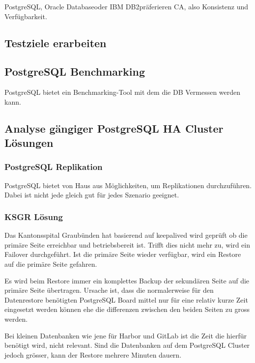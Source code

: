 \Gls{PostgreSQL}, \Gls{Oracle Database}oder \Gls{IBM DB2}präferieren CA, also Konsistenz und Verfügbarkeit.

\subsection{Testziele erarbeiten}
\subsection{PostgreSQL Benchmarking}
PostgreSQL bietet ein Benchmarking-Tool\cite{TYJFF7AB,VXNYQFTE} mit dem die DB Vermessen werden kann.
\subsection{Analyse gängiger PostgreSQL HA Cluster Lösungen}
\subsubsection{\Gls{PostgreSQL} Replikation}
PostgreSQL bietet von Haus aus Möglichkeiten, um Replikationen durchzuführen.
Dabei ist nicht jede gleich gut für jedes Szenario geeignet\cite{FZAHA89U}.

\subsubsection{KSGR Lösung}
Das Kantonsspital Graubünden hat basierend auf \gls{keepalived} wird geprüft ob die primäre Seite erreichbar und betriebsbereit ist.
Trifft dies nicht mehr zu, wird ein \Gls{Failover} durchgeführt\cite{NLF2IDBZ}.
Ist die primäre Seite wieder verfügbar, wird ein Restore auf die primäre Seite gefahren.

Es wird beim Restore immer ein komplettes Backup der sekundären Seite auf die primäre Seite übertragen.
Ursache ist, dass die normalerweise für den Datenrestore benötigten \Gls{PostgreSQL} Board mittel nur für eine relativ kurze Zeit eingesetzt werden können ehe die differenzen zwischen den beiden Seiten zu gross werden.

Bei kleinen Datenbanken wie jene für \Gls{Harbor} und \Gls{GitLab} ist die Zeit die hierfür benötigt wird, nicht relevant.
Sind die Datenbanken auf dem \Gls{PostgreSQL Cluster} jedoch grösser, kann der Restore mehrere Minuten dauern.
